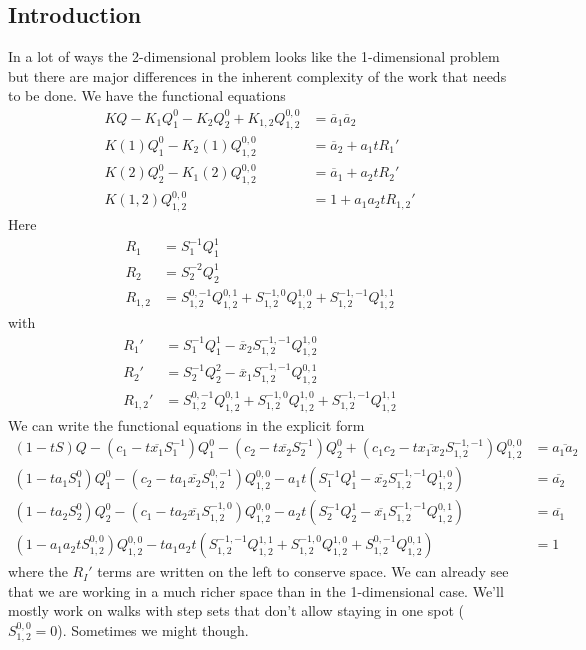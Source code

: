 \documentclass[12pt]{article}
\theoremstyle{definition} \newtheorem{definition}[theorem]{Definition}
\newcommand{\ol}[1]{\overline{#1}}
\newcommand{\Qf}[1]{Q_{1,2}^{#1}}
\newcommand{\Sf}[1]{S_{1,2}^{#1}}
\begin{document}
\subsection{Introduction}
In a lot of ways the 2-dimensional problem looks like the 1-dimensional problem but there are major differences in the inherent complexity of the work that needs to be done. We have the functional equations
\begin{align*}
KQ - K_1Q_1^0-K_2Q_2^0 + K_{1,2} Q_{1,2}^{0,0} &= \ol{a}_1\ol{a}_2\\
K(1)Q_1^0 - K_2(1)Q_{1,2}^{0,0} &= \ol{a}_2 + a_1 t R_1'\\
K(2)Q_2^0 - K_1(2)Q_{1,2}^{0,0}&= \ol{a}_1 + a_2 t R_2'\\
K(1,2) Q_{1,2}^{0,0}&= 1 + a_1 a_2t R_{1,2}'
\end{align*}
Here
\begin{align*}
	R_1 &= S_1^{-1}Q_1^1\\
	R_2 &= S_2^{-2}Q_2^1\\
	R_{1,2} & = \Sf{0,-1}\Qf{0,1}+\Sf{-1,0}\Qf{1,0}+\Sf{-1,-1}\Qf{1,1}
\end{align*}
with
\begin{align*}
	R_1' &= S_1^{-1}Q_1^1 - \ol{x}_2\Sf{-1,-1}\Qf{1,0}\\
	R_2' &= S_2^{-1}Q_2^2 - \ol{x}_1\Sf{-1,-1}\Qf{0,1}\\
	R_{1,2}' & = \Sf{0,-1}\Qf{0,1}+\Sf{-1,0}\Qf{1,0}+\Sf{-1,-1}\Qf{1,1}
\end{align*}
We can write the functional equations in the explicit form
\begin{align}
(1-tS)Q - (c_1-t\ol{x_1}S_1^{-1}) Q_1^0- (c_2-t\ol{x_2}S_2^{-1}) Q_2^0+ (c_1c_2-t\ol{x_1x_2}S_{1,2}^{-1,-1})Q_{1,2}^{0,0}  &= \ol{a_1a_2}\\
(1-ta_1 S_1^0)Q_1^0 - (c_2-ta_1\ol{x_2}S_{1,2}^{0,-1})Q_{1,2}^{0,0} - a_1 t(S_1^{-1}Q_1^1-\ol{x_2}S_{1,2}^{-1,-1}Q_{1,2}^{1,0}) &=\ol{a_2}\\
(1-ta_2 S_2^0)Q_2^0 - (c_1-ta_2\ol{x_1}S_{1,2}^{-1,0})Q_{1,2}^{0,0} -a_2t(S_2^{-1}Q_2^1-\ol{x_1}S_{1,2}^{-1,-1}Q_{1,2}^{0,1}) &=\ol{a_1}\\
(1-a_1 a_2 t \Sf{0,0})Q_{1,2}^{0,0} - ta_1a_2t(\Sf{-1,-1}\Qf{1,1}+\Sf{-1,0}\Qf{1,0}+\Sf{0,-1}\Qf{0,1})&= 1
\end{align}
where the $R_I'$ terms are written on the left to conserve space. We can already see that we are working in a much richer space than in the 1-dimensional case. We'll mostly work on walks with step sets that don't allow staying in one spot ($\Sf{0,0} = 0$). Sometimes we might though.
\end{document}
